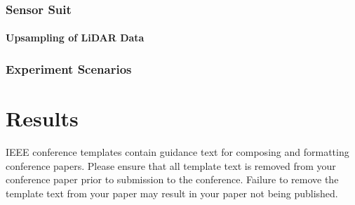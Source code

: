 \documentclass[conference]{IEEEtran}
\begin{document}
\subsubsection{Sensor Suit}
\paragraph{Upsampling of LiDAR Data}

\subsubsection{Experiment Scenarios}


\section{Results}



\vspace{12pt}
\color{red}
IEEE conference templates contain guidance text for composing and formatting conference papers. Please ensure that all template text is removed from your conference paper prior to submission to the conference. Failure to remove the template text from your paper may result in your paper not being published.
\end{document}
